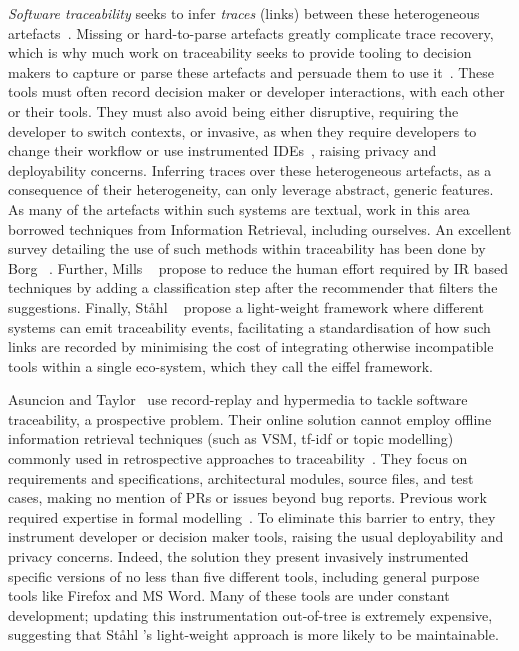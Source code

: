 \emph{Software traceability} seeks to infer \emph{traces} (\ie links) between
these heterogeneous artefacts~\cite{Cleland-Huang2014}. Missing or hard-to-parse
artefacts greatly complicate trace recovery, which is why much work on
traceability seeks to provide tooling to decision makers to capture or parse
these artefacts and persuade them to use it~\cite{Neumuller06, jiralinkdoc,
ghlinkdoc}. These tools must often record decision maker or developer
interactions, with each other or their tools. They must also avoid being either
disruptive, requiring the developer to switch contexts, or invasive, as when
they require developers to change their workflow or use instrumented
IDEs~\cite{TopicTraceability}, raising privacy and deployability concerns.
Inferring traces over these heterogeneous artefacts, as a consequence of their
heterogeneity, can only leverage abstract, generic features. As many of the
artefacts within such systems are textual, work in this area borrowed techniques
from Information Retrieval, including ourselves. An excellent survey detailing
the use of such methods within traceability has been done by Borg
\etal~\cite{Borg2014}. Further, Mills
\etal~\cite{Mills:2017:ATL:3106237.3121280} propose to reduce the human effort
required by IR based techniques by adding a classification step after the
recommender that filters the suggestions. Finally, St{\aa}hl
\etal~\cite{Stahl2017} propose a light-weight framework where different systems
can emit traceability events, facilitating a standardisation of how such links
are recorded by minimising the cost of integrating otherwise incompatible tools
within a single eco-system, which they call the eiffel framework.

Asuncion and Taylor~\cite{Asuncion:2009:CCL:1556908.1557008} use record-replay
and hypermedia to tackle software traceability, a prospective problem. Their
online solution cannot employ offline information retrieval techniques (such as
VSM, tf-idf or topic modelling) commonly used in retrospective approaches to
traceability~\cite{4249808}. They focus on requirements and specifications,
architectural modules, source files, and test cases, making no mention of PRs or
issues beyond bug reports. Previous work required expertise in formal
modelling~\cite{Pohl96, Pinheiro96}. To eliminate this barrier to entry, they
instrument developer or decision maker tools, raising the usual deployability
and privacy concerns. Indeed, the solution they present invasively instrumented
specific versions of no less than five different tools, including general
purpose tools like Firefox and MS Word. Many of these tools are under constant
development; updating this instrumentation out-of-tree is extremely expensive,
suggesting that St{\aa}hl \etal's light-weight approach is more likely to be
maintainable.

